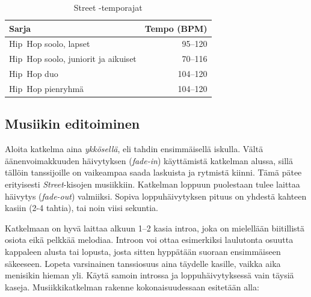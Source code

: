 \documentclass[12pt, a4paper, oneside]{article}
\begin{document}
\begin{table}[ht]
    \centering
    \setlength\tabcolsep{8mm}
    \renewcommand{\arraystretch}{1.5}
    \begin{tabular}{@{\hspace{0.25cm}}lr@{\hspace{0.25cm}}}
        \toprule
        Sarja                               & Tempo (BPM) \\ \midrule
        Hip~Hop soolo, lapset               & 95--120     \\
        Hip~Hop soolo, juniorit ja aikuiset & 70--116     \\
        Hip~Hop duo                         & 104--120    \\
        Hip~Hop pienryhmä                   & 104--120    \\ \bottomrule
    \end{tabular}
    \caption{Street -temporajat}
    \label{tab:street-bpm}
\end{table}

\subsection{Musiikin editoiminen} \label{subsec:editoiminen}

Aloita katkelma aina \textit{ykkösellä}, eli tahdin ensimmäisellä iskulla.
Vältä äänenvoimakkuuden häivytyksen (\textit{fade-in}) käyttämistä katkelman alussa,
sillä tällöin tanssijoille on vaikeampaa saada laskuista ja rytmistä kiinni.
Tämä pätee erityisesti \textit{Street}-kisojen musiikkiin.
Katkelman loppuun puolestaan tulee laittaa häivytys (\textit{fade-out}) valmiiksi.
Sopiva loppuhäivytyksen pituus on yhdestä kahteen kasiin (2-4 tahtia),
tai noin viisi sekuntia.

Katkelmaan on hyvä laittaa alkuun 1--2 kasia introa,
joka on mielellään biitillistä osiota eikä pelkkää melodiaa.
Introon voi ottaa esimerkiksi laulutonta osuutta kappaleen alusta tai lopusta,
josta sitten hyppätään suoraan ensimmäiseen säkeeseen.
Lopeta varsinainen tanssiosuus aina täydelle kasille,
vaikka aika menisikin hieman yli.
Käytä samoin introssa ja loppuhäivytyksessä vain täysiä kaseja.
Musiikkikatkelman rakenne kokonaisuudessaan esitetään alla: \\

\begin{figure}[ht]
    \centering
    \semiboldfont
    \label{fig:katkelma}
\end{figure}
\end{document}
